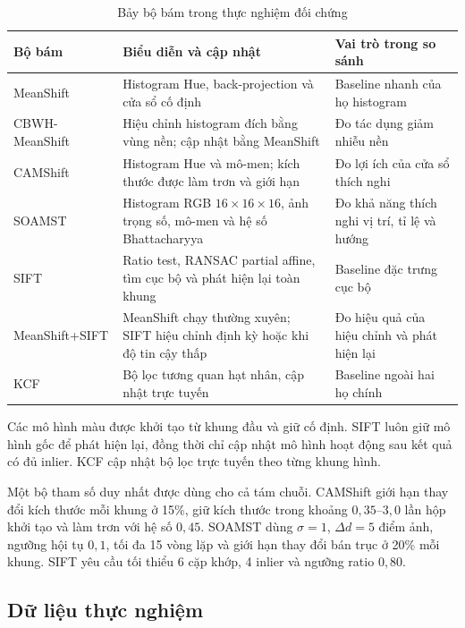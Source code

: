 \documentclass[12pt,a4paper]{article}
\numberwithin{equation}{section}
\begin{document}
\begin{table}[H]
\centering
\caption{Bảy bộ bám trong thực nghiệm đối chứng}
\label{tab:experimental-trackers}
\scriptsize
\begin{tabular}{@{}l>{\raggedright\arraybackslash}p{5.0cm}>{\raggedright\arraybackslash}p{5.8cm}@{}}
\toprule
\textbf{Bộ bám} & \textbf{Biểu diễn và cập nhật} & \textbf{Vai trò trong so sánh} \\
\midrule
MeanShift & Histogram Hue, back-projection và cửa sổ cố định & Baseline nhanh của họ histogram \\
CBWH-MeanShift & Hiệu chỉnh histogram đích bằng vùng nền; cập nhật bằng MeanShift & Đo tác dụng giảm nhiễu nền \\
CAMShift & Histogram Hue và mô-men; kích thước được làm trơn và giới hạn & Đo lợi ích của cửa sổ thích nghi \\
SOAMST~\cite{ning2012soamst} & Histogram RGB $16\times16\times16$, ảnh trọng số, mô-men và hệ số Bhattacharyya & Đo khả năng thích nghi vị trí, tỉ lệ và hướng \\
SIFT & Ratio test, RANSAC partial affine, tìm cục bộ và phát hiện lại toàn khung & Baseline đặc trưng cục bộ \\
MeanShift+SIFT & MeanShift chạy thường xuyên; SIFT hiệu chỉnh định kỳ hoặc khi độ tin cậy thấp & Đo hiệu quả của hiệu chỉnh và phát hiện lại \\
KCF~\cite{henriques2015} & Bộ lọc tương quan hạt nhân, cập nhật trực tuyến & Baseline ngoài hai họ chính \\
\bottomrule
\end{tabular}
\end{table}

Các mô hình màu được khởi tạo từ khung đầu và giữ cố định. SIFT luôn giữ mô hình gốc để phát hiện
lại, đồng thời chỉ cập nhật mô hình hoạt động sau kết quả có đủ inlier. KCF cập nhật bộ lọc trực
tuyến theo từng khung hình.

Một bộ tham số duy nhất được dùng cho cả tám chuỗi. CAMShift giới hạn thay đổi kích thước mỗi khung
ở 15\%, giữ kích thước trong khoảng $0{,}35$--$3{,}0$ lần hộp khởi tạo và làm trơn với hệ số
$0{,}45$. SOAMST dùng $\sigma=1$, $\Delta d=5$ điểm ảnh, ngưỡng hội tụ $0{,}1$, tối đa 15 vòng
lặp và giới hạn thay đổi bán trục ở 20\% mỗi khung. SIFT yêu cầu tối thiểu 6 cặp khớp, 4 inlier và
ngưỡng ratio $0{,}80$.

\subsection{Dữ liệu thực nghiệm}
\end{document}
